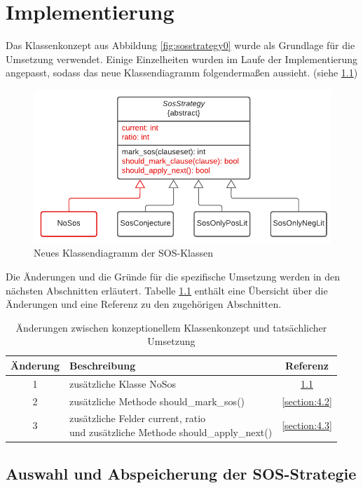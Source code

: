 
\chapter{Implementierung}

Das Klassenkonzept aus Abbildung \ref{fig:sosstrategy0} wurde als Grundlage für die Umsetzung verwendet. Einige Einzelheiten wurden im Laufe der Implementierung angepasst, sodass das neue Klassendiagramm folgendermaßen aussieht. (siehe \ref{fig:sosstrategy1})

\begin{figure}[h]
	\centering
	\includegraphics[width=0.7\linewidth]{images/Lucid/SosStrategy1}
	\caption{Neues Klassendiagramm der SOS-Klassen}
	\label{fig:sosstrategy1}
\end{figure}


Die Änderungen und die Gründe für die spezifische Umsetzung werden in den nächsten Abschnitten erläutert. Tabelle \ref{table:difference_sos_classes} enthält eine Übersicht über die Änderungen und eine Referenz zu den zugehörigen Abschnitten.
\begin{table}[h]
	\centering
	\begin{tabular}{|c|l|c|}
		\hline
		Änderung & Beschreibung & Referenz \\
		\hline
		1 & zusätzliche Klasse NoSos & \ref{section:4.1} \\
		\hline
		2 & zusätzliche Methode should\_mark\_sos() & \ref{section:4.2} \\
		\hline
		3 & \cellbreak{l}{zusätzliche Felder current, ratio \\ und zusätzliche Methode should\_apply\_next()} & \ref{section:4.3} \\
		\hline
	\end{tabular}
	\caption{Änderungen zwischen konzeptionellem Klassenkonzept und tatsächlicher Umsetzung}
	\label{table:difference_sos_classes}
\end{table}

\section{Auswahl und Abspeicherung der SOS-Strategie}
\label{section:4.1}

